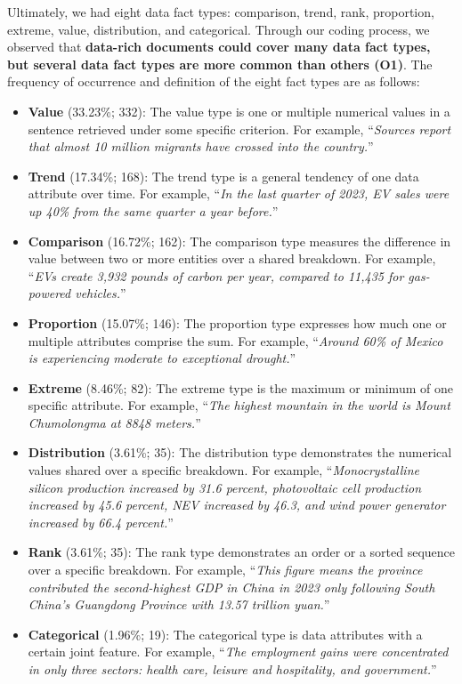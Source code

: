 Ultimately, we had eight data fact types: comparison, trend, rank, proportion, extreme, value, distribution, and categorical. Through our coding process, we observed that \textbf{data-rich documents could cover many data fact types, but several data fact types are more common than others (O1)}. The frequency of occurrence and definition of the eight fact types are as follows:
\begin{itemize}%
    \item \textbf{Value} (33.23\%; 332): The value type is one or multiple numerical values in a sentence retrieved under some specific criterion. For example, ``\textit{Sources report that almost 10 million migrants have crossed into the country.}''
    \item \textbf{Trend} (17.34\%; 168): The trend type is a general tendency of one data attribute over time. For example, ``\textit{In the last quarter of 2023, EV sales were up 40\% from the same quarter a year before.}''
    \item \textbf{Comparison} (16.72\%; 162): The comparison type measures the difference in value between two or more entities over a shared breakdown. For example, ``\textit{EVs create 3,932 pounds of carbon per year, compared to 11,435 for gas-powered vehicles.}''
    \item \textbf{Proportion} (15.07\%; 146): The proportion type expresses how much one or multiple attributes comprise the sum. For example, ``\textit{Around 60\% of Mexico is experiencing moderate to exceptional drought.}''
    \item \textbf{Extreme} (8.46\%; 82): The extreme type is the maximum or minimum of one specific attribute. For example, ``\textit{The highest mountain in the world is Mount Chumolongma at 8848 meters.}''  
    \item \textbf{Distribution} (3.61\%; 35): The distribution type demonstrates the numerical values shared over a specific breakdown. For example, ``\textit{Monocrystalline silicon production increased by 31.6 percent, photovoltaic cell production increased by 45.6 percent, NEV increased by 46.3, and wind power generator increased by 66.4 percent.}''
    \item \textbf{Rank} (3.61\%; 35): The rank type demonstrates an order or a sorted sequence over a specific breakdown. For example, ``\textit{This figure means the province contributed the second-highest GDP in China in 2023 only following South China's Guangdong Province with 13.57 trillion yuan.}''  
    \item \textbf{Categorical} (1.96\%; 19): The categorical type is data attributes with a certain joint feature. For example, ``\textit{The employment gains were concentrated in only three sectors: health care, leisure and hospitality, and government.}''
\end{itemize}


